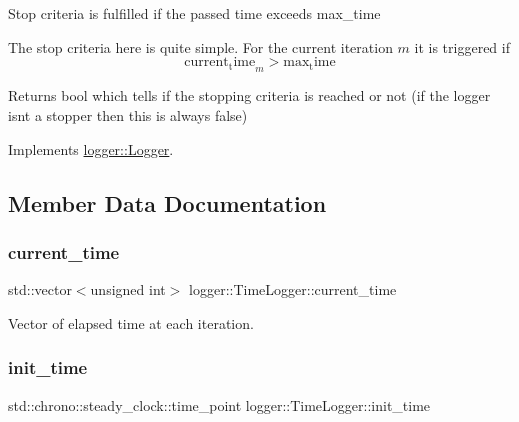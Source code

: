 Stop criteria is fulfilled if the passed time exceeds {\ttfamily max\+\_\+time} 

The stop criteria here is quite simple. For the current iteration $m$ it is triggered if \[ \mathrm{current_time}_m > \mathrm{max_time} \]

\begin{DoxyReturn}{Returns}
{\ttfamily bool} which tells if the stopping criteria is reached or not (if the logger isn\textquotesingle{}t a stopper then this is always false) 
\end{DoxyReturn}


Implements \mbox{\hyperlink{classlogger_1_1_logger_aed91421c07062b91cee158ef2bda7ae8}{logger\+::\+Logger}}.



\subsection{Member Data Documentation}
\mbox{\label{classlogger_1_1_time_logger_a57bbc70bcc5e0fb1b1a62d49af30bf3b}} 
\subsubsection{\texorpdfstring{current\+\_\+time}{current\_time}}
{\footnotesize\ttfamily std\+::vector$<$unsigned int$>$ logger\+::\+Time\+Logger\+::current\+\_\+time\hspace{0.3cm}{\ttfamily [private]}}



Vector of elapsed time at each iteration. 

\mbox{\label{classlogger_1_1_time_logger_ac6bc060040da5dc7b8b20bdae3b7cd2b}} 
\subsubsection{\texorpdfstring{init\+\_\+time}{init\_time}}
{\footnotesize\ttfamily std\+::chrono\+::steady\+\_\+clock\+::time\+\_\+point logger\+::\+Time\+Logger\+::init\+\_\+time\hspace{0.3cm}{\ttfamily [private]}}




